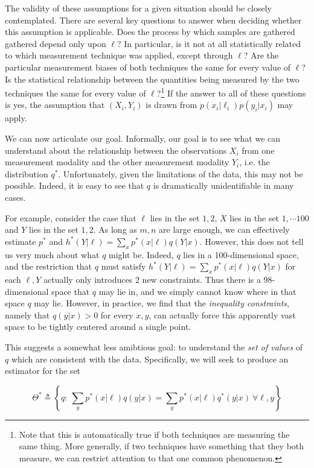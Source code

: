 The validity of these assumptions for a given situation should be closely contemplated.  There are several key questions to answer when deciding whether this assumption is applicable.  Does the process by which samples are gathered gathered depend only upon $\ell$?  In particular, is it not at all statistically related to which measurement technique was  applied, except through $\ell$?  Are the particular measurement biases of both techniques the same for every value of $\ell$?  Is the statistical relationship between the quantities being measured by the two techniques the same for every value of $\ell$?\footnote{Note that this is automatically true if both techniques are measuring the same thing.  More generally, if two techniques have something that they both measure, we can restrict attention to that one common phenomenon.}  If the answer to all of these questions is yes, the assumption that $(X_i,Y_i)$ is drawn from $p(x_i|\ell_i)p(y_i|x_i)$ may apply.

We can now articulate our goal.  Informally, our goal is to see what we can understand about the relationship between the observations $X_i$ from one measurement modality and the other measurement modality $Y_i$, i.e. the distribution $q^*$.  Unfortunately, given the limitations of the data, this may not be possible.  Indeed, it is easy to see that $q$ is dramatically unidentifiable in many cases.  

For example, consider the case that $\ell$ lies in the set ${1,2}$, $X$ lies in the set ${1,\cdots 100}$ and $Y$ lies in the set ${1,2}$.  As long as $m,n$ are large enough, we can effectively estimate $p^*$ and $h^*(Y|\ell)=\sum_x p^*(x|\ell)q(Y|x)$.  However, this does not tell us very much about what $q$ might be.  Indeed, $q$ lies in a 100-dimensional space, and the restriction that $q$ must satisfy $h^*(Y|\ell)=\sum_x p^*(x|\ell)q(Y|x)$ for each $\ell,Y$ actually only introduces 2 new constraints.  Thus there is a 98-dimensional space that $q$ may lie in, and we simply cannot know where in that space $q$ may lie.  However, in practice, we find that the \emph{inequality constraints}, namely that $q(y|x)>0$ for every $x,y$, can actually force this apparently vast space to be tightly centered around a single point.  

This suggests a somewhat less amibtious goal: to understand the \emph{set of values} of $q$ which are consistent with the data.  Specifically, we will seek to produce an estimator for the set

\begin{equation*}
\Theta^* \triangleq \left\{q:\ \sum_y p^*(x|\ell)q(y|x) = \sum_y p^*(x|\ell)q^*(y|x)\ \forall \ell,y\right\}
\end{equation*}

